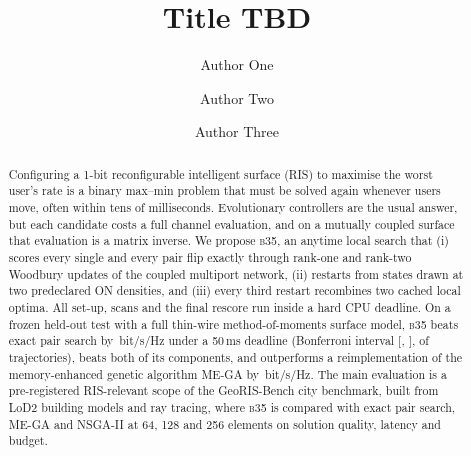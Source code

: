 \documentclass[runningheads]{llncs}
\newcommand{\bts}{\textsc{b35}}
\begin{document}
\title{Title TBD}
\author{Author One \and
Author Two \and
Author Three}
\maketitle

\begin{abstract}
Configuring a 1-bit reconfigurable intelligent surface (RIS) to maximise the worst user's rate is a binary max--min problem that must be solved again whenever users move, often within tens of milliseconds. Evolutionary controllers are the usual answer, but each candidate costs a full channel evaluation, and on a mutually coupled surface that evaluation is a matrix inverse. We propose \bts{}, an anytime local search that (i) scores every single and every pair flip exactly through rank-one and rank-two Woodbury updates of the coupled multiport network, (ii) restarts from states drawn at two predeclared ON densities, and (iii) every third restart recombines two cached local optima. All set-up, scans and the final rescore run inside a hard CPU deadline. On a frozen held-out test with a full thin-wire method-of-moments surface model, \bts{} beats exact pair search by \,bit/s/Hz under a 50\,ms deadline (Bonferroni interval [, ],  of  trajectories), beats both of its components, and outperforms a reimplementation of the memory-enhanced genetic algorithm ME-GA by \,bit/s/Hz. The main evaluation is a pre-registered RIS-relevant scope of the GeoRIS-Bench city benchmark, built from LoD2 building models and ray tracing, where \bts{} is compared with exact pair search, ME-GA and NSGA-II at 64, 128 and 256 elements on solution quality, latency and budget.
\end{abstract}

\end{document}
